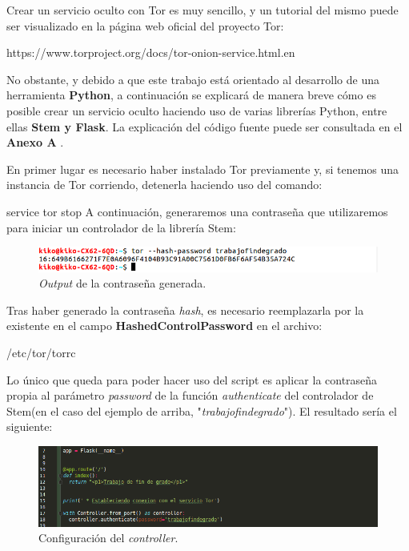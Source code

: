 Crear un servicio oculto con Tor es muy sencillo, y un tutorial del mismo puede ser visualizado en la página web oficial del proyecto Tor:

	{\selectfont 
		https://www.torproject.org/docs/tor-onion-service.html.en
	}

No obstante, y debido a que este trabajo está orientado al desarrollo de una herramienta \textbf{Python}, a continuación se explicará de manera breve cómo es posible crear un servicio oculto haciendo uso de varias librerías Python, entre ellas \textbf{Stem y Flask}.
La explicación del código fuente puede ser consultada en el \textbf{Anexo A }.

En primer lugar es necesario haber instalado Tor previamente y, si tenemos una instancia de Tor corriendo, detenerla haciendo uso del comando:

	{\selectfont 
		service tor stop
	}
A continuación, generaremos una contraseña que utilizaremos para iniciar un controlador de la librería Stem:

	\begin{figure}[h]
		\centerline{
			\mbox{\includegraphics[width=5.00in]{images/hashed_pwd.png}}
		}
		\caption{\textit{Output} de la contraseña generada.}
		\label{fig:TorPwd}
	\end{figure}
	
Tras haber generado la contraseña \textit{hash}, es necesario reemplazarla por la existente en el campo \textbf{HashedControlPassword} en el archivo:

	{\selectfont 
		/etc/tor/torrc
	}

Lo único que queda para poder hacer uso del script es aplicar la contraseña propia al parámetro \textit{password} de la función \textit{authenticate} del controlador de Stem(en el caso del ejemplo de arriba, "\textit{trabajofindegrado}"). El resultado sería el siguiente:

	\begin{figure}[h]
		\centerline{
			\mbox{\includegraphics[width=5.00in]{images/controller_auth.png}}
		}
		\caption{Configuración del \textit{controller}.}
		\label{fig:controller}
	\end{figure}

